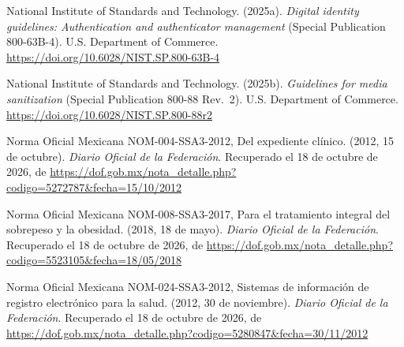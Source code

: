 \documentclass[12pt, a4paper]{article}
\begin{document}
\begin{list}{}{\setlength{\leftmargin}{1.27cm}\setlength{\itemindent}{-1.27cm}%
  \setlength{\labelwidth}{0pt}\setlength{\labelsep}{0pt}\setlength{\itemsep}{6pt}}
\item National Institute of Standards and Technology. (2025a).
  \textit{Digital identity guidelines: Authentication and
  authenticator management} (Special Publication 800-63B-4).
  U.S. Department of Commerce.
  \url{https://doi.org/10.6028/NIST.SP.800-63B-4}
 
 
\item National Institute of Standards and Technology. (2025b).
  \textit{Guidelines for media sanitization} (Special Publication
  800-88 Rev.~2). U.S. Department of Commerce.
  \url{https://doi.org/10.6028/NIST.SP.800-88r2}
 

\item Norma Oficial Mexicana NOM-004-SSA3-2012, Del expediente
  clínico. (2012, 15 de octubre). \textit{Diario Oficial de la
  Federación}.
  Recuperado el 18 de octubre de 2026, de \url{https://dof.gob.mx/nota_detalle.php?codigo=5272787&fecha=15/10/2012}


\item Norma Oficial Mexicana NOM-008-SSA3-2017, Para el tratamiento
  integral del sobrepeso y la obesidad. (2018, 18 de mayo).
  \textit{Diario Oficial de la Federación}.
  Recuperado el 18 de octubre de 2026, de \url{https://dof.gob.mx/nota_detalle.php?codigo=5523105&fecha=18/05/2018}


\item Norma Oficial Mexicana NOM-024-SSA3-2012, Sistemas de
  información de registro electrónico para la salud. (2012,
  30 de noviembre). \textit{Diario Oficial de la Federación}.
  Recuperado el 18 de octubre de 2026, de \url{https://dof.gob.mx/nota_detalle.php?codigo=5280847&fecha=30/11/2012}

  

\end{list}
\end{document}
